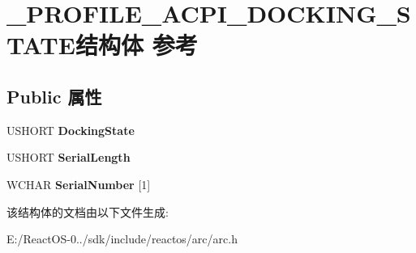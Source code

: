 \hypertarget{struct___p_r_o_f_i_l_e___a_c_p_i___d_o_c_k_i_n_g___s_t_a_t_e}{}\section{\+\_\+\+P\+R\+O\+F\+I\+L\+E\+\_\+\+A\+C\+P\+I\+\_\+\+D\+O\+C\+K\+I\+N\+G\+\_\+\+S\+T\+A\+T\+E结构体 参考}
\label{struct___p_r_o_f_i_l_e___a_c_p_i___d_o_c_k_i_n_g___s_t_a_t_e}
\subsection*{Public 属性}
\begin{DoxyCompactItemize}
\item 
\mbox{\label{struct___p_r_o_f_i_l_e___a_c_p_i___d_o_c_k_i_n_g___s_t_a_t_e_ab15d5a227bed6484dc7aeabe4156bead}} 
U\+S\+H\+O\+RT {\bfseries Docking\+State}
\item 
\mbox{\label{struct___p_r_o_f_i_l_e___a_c_p_i___d_o_c_k_i_n_g___s_t_a_t_e_a93adf3fe4789a93d3a871c12e6bd08cc}} 
U\+S\+H\+O\+RT {\bfseries Serial\+Length}
\item 
\mbox{\label{struct___p_r_o_f_i_l_e___a_c_p_i___d_o_c_k_i_n_g___s_t_a_t_e_a7816d8063cfb69c60844d37f31b35983}} 
W\+C\+H\+AR {\bfseries Serial\+Number} \mbox{[}1\mbox{]}
\end{DoxyCompactItemize}


该结构体的文档由以下文件生成\+:\begin{DoxyCompactItemize}
\item 
E\+:/\+React\+O\+S-\/0../sdk/include/reactos/arc/arc.\+h\end{DoxyCompactItemize}
